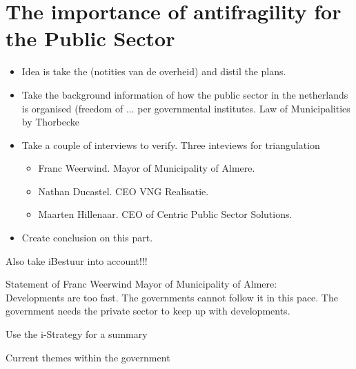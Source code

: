 \chapter{The importance of antifragility for the Public Sector}

\begin{itemize}
\item{Idea is take the (notities van de overheid) and distil the plans.}
\item{Take the background information of how the public sector in the netherlands is organised (freedom of ... per governmental institutes. Law of Municipalities by Thorbecke }
\item{Take a couple of interviews to verify. Three inteviews for triangulation}
\begin{itemize}
	\item{Franc Weerwind. Mayor of Municipality of Almere.}
	\item{Nathan Ducastel. CEO VNG Realisatie.}
	\item{Maarten Hillenaar. CEO of Centric Public Sector Solutions.}
\end{itemize}
\item{Create conclusion on this part.}
\end{itemize}

\begin{remark}
	Also take iBestuur into account!!!
\end{remark}

Statement of Franc Weerwind Mayor of Municipality of Almere:\\
Developments are too fast. The governments cannot follow it in this pace. The government needs the private sector to keep up with developments.\\

\begin{remark}
	Use the i-Strategy for a summary \parencite{Digitaleoverheid}
\end{remark}

Current themes within the government 